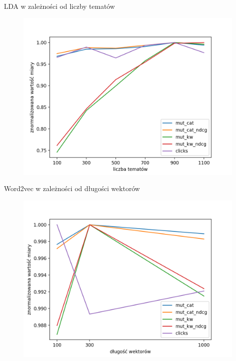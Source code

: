 \documentclass{beamer}
\begin{document}
	\begin{frame}{LDA w zależności od liczby tematów}
		\begin{figure}[H]
			\centering
			\includegraphics[width=1\textwidth]{img/results/lda_.png}
		\end{figure}
	\end{frame}
	\begin{frame}{Word2vec w zależności od długości wektorów}
		\begin{figure}[H]
			\centering
			\includegraphics[width=1\textwidth]{img/results/w2v_ctr.png}
		\end{figure}
	\end{frame}
\end{document}
